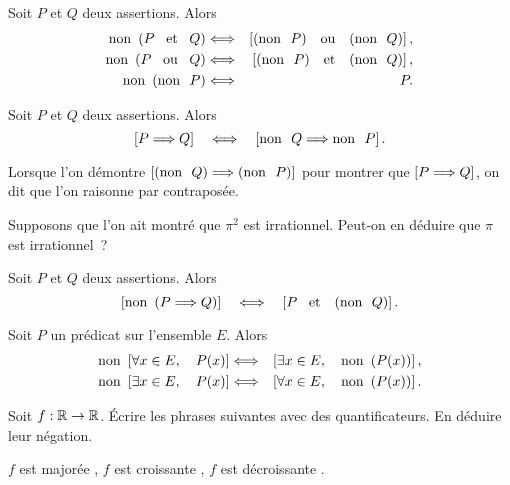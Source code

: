 \documentclass{magnolia}
\begin{document}
\begin{proposition}[utile=-3, nom={Lois de \nom{Morgan}}]
Soit $P$ et $Q$ deux assertions. Alors
\begin{eqnarray*}
\non\p{P \et Q} &\ssi& \cro{\p{\non\  P} \ou \p{\non\  Q}},\\
\non\p{P \ou Q} &\ssi& \cro{\p{\non\  P} \et \p{\non\  Q}},\\
\non\p{\non\  P} &\ssi& P.
\end{eqnarray*}
\end{proposition}

\begin{proposition}[utile=-3, nom={Raisonnement par contraposée}]
Soit $P$ et $Q$ deux assertions. Alors
\[\left[P \Longrightarrow Q\right] \quad\Longleftrightarrow\quad \left[{\rm non}\ \  Q \Longrightarrow {\rm non}\ \  P\right].\]
\end{proposition}

\begin{remarqueUnique}
\remarque Lorsque l'on démontre $\left[\left({\rm non}\ \  Q\right) \Longrightarrow \left({\rm non}\ \  P\right)\right]$ pour montrer
  que $\left[P\Longrightarrow Q\right]$, on dit que l'on raisonne par contraposée.
\end{remarqueUnique}

\begin{exoUnique}
\exo Supposons que l'on ait montré que $\pi^2$ est irrationnel. Peut-on en
  déduire que $\pi$ est irrationnel~?
\end{exoUnique}

\begin{proposition}[utile=-3]
Soit $P$ et $Q$ deux assertions. Alors
\[\left[{\rm non}\ \left(P \Longrightarrow Q\right)\right] \quad\Longleftrightarrow\quad \left[P \quad\!\text{et}\quad\! \left({\rm non}\ \ Q\right)\right].\]  
\end{proposition}


\begin{proposition}[utile=-3]
Soit $P$ un prédicat sur l'ensemble $E$. Alors
\begin{eqnarray*}
{\rm non}\ \left[\forall x\in E ,\quad P(x)\right] &\Longleftrightarrow&
\left[\exists x\in E ,\quad {\rm non}\ \left(P(x)\right)\right],\\
{\rm non}\ \left[\exists x\in E ,\quad P(x)\right] &\Longleftrightarrow&
\left[\forall x\in E ,\quad {\rm non}\ \left(P(x)\right)\right].
\end{eqnarray*}
\end{proposition}

\begin{exoUnique}
\exo Soit $f:\mathbb{R}\to\mathbb{R}$. Écrire les phrases suivantes avec des
  quantificateurs. En déduire leur négation. \begin{center}
  \og $f$ est majorée \fg,
  \og $f$ est croissante \fg, \og $f$ est décroissante \fg. \end{center}
\end{exoUnique}
\end{document}
